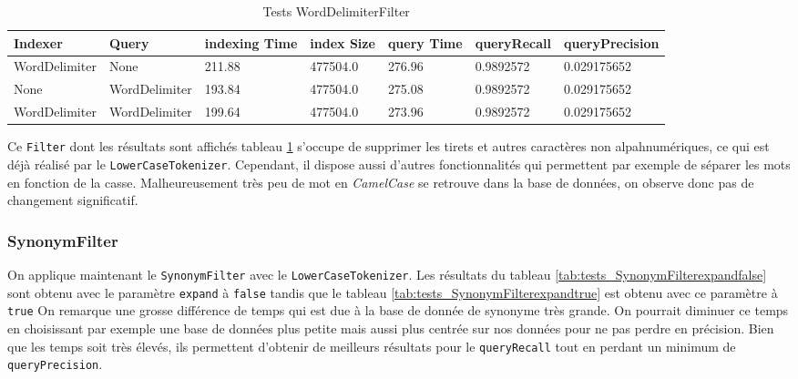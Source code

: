 \begin{table}[!htbp]
    \hspace{-2cm}
                \begin{tabular}{|p{2.1cm}|p{2.1cm}|p{2cm}|p{2cm}|p{2.5cm}|p{2.5cm}|p{2.5cm}|}
                    \hline
                    \textbf{Indexer} & \textbf{Query} & \textbf{indexing Time} & \textbf{index Size} & \textbf{query Time} & \textbf{queryRecall} & \textbf{queryPrecision}\\
                    \hline
WordDelimiter & None & 211.88 & 477504.0 & 276.96 & 0.9892572 & 0.029175652\\
		\hline
None & WordDelimiter & 193.84 & 477504.0 & 275.08 & 0.9892572 & 0.029175652\\
		\hline
WordDelimiter & WordDelimiter & 199.64 & 477504.0 & 273.96 & 0.9892572 & 0.029175652\\
                    \hline
                \end{tabular}
                \caption{Tests WordDelimiterFilter}
                \label{tab:tests_WordDelimiterFilter}
            \end{table}

Ce \texttt{Filter} dont les résultats sont affichés tableau \ref{tab:tests_WordDelimiterFilter} s’occupe de supprimer les tirets et autres caractères non alpahnumériques, ce qui est déjà réalisé par le \texttt{LowerCaseTokenizer}. Cependant, il dispose aussi d’autres fonctionnalités qui permettent par exemple de séparer les mots en fonction de la casse. Malheureusement très peu de mot en \textit{CamelCase} se retrouve dans la base de données, on observe donc pas de changement significatif.

\subsubsection{SynonymFilter}

On applique maintenant le \texttt{SynonymFilter} avec le \texttt{LowerCaseTokenizer}. Les résultats du tableau \ref{tab:tests_SynonymFilterexpandfalse} sont obtenu avec le paramètre \texttt{expand} à \texttt{false} tandis que le tableau \ref{tab:tests_SynonymFilterexpandtrue} est obtenu avec ce paramètre à \texttt{true}
On remarque une grosse différence de temps qui est due à la base de donnée de synonyme très grande. On pourrait diminuer ce temps en choisissant par exemple une base de données plus petite mais aussi plus centrée sur nos données pour ne pas perdre en précision.
Bien que les temps soit très élevés, ils permettent d’obtenir de meilleurs résultats pour le \texttt{queryRecall} tout en perdant un minimum de \texttt{queryPrecision}.


